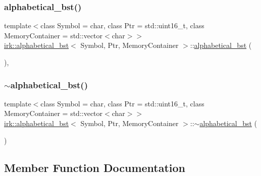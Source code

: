 \subsubsection{\texorpdfstring{alphabetical\+\_\+bst()}{alphabetical\_bst()}\hspace{0.1cm}{\footnotesize\ttfamily [4/4]}}
{\footnotesize\ttfamily template$<$class Symbol = char, class Ptr = std\+::uint16\+\_\+t, class Memory\+Container = std\+::vector$<$char$>$$>$ \\
\mbox{\hyperlink{classirk_1_1alphabetical__bst}{irk\+::alphabetical\+\_\+bst}}$<$ Symbol, Ptr, Memory\+Container $>$\+::\mbox{\hyperlink{classirk_1_1alphabetical__bst}{alphabetical\+\_\+bst}} (\begin{DoxyParamCaption}\item[{\mbox{\hyperlink{classirk_1_1alphabetical__bst}{alphabetical\+\_\+bst}}$<$ Symbol, Ptr, Memory\+Container $>$ \&\&}]{ }\end{DoxyParamCaption})\hspace{0.3cm}{\ttfamily [default]}, {\ttfamily [noexcept]}}

\mbox{\label{classirk_1_1alphabetical__bst_ae03b179ec6e763b0f74b106bd51fe1d9}} 
\subsubsection{\texorpdfstring{$\sim$alphabetical\+\_\+bst()}{~alphabetical\_bst()}}
{\footnotesize\ttfamily template$<$class Symbol = char, class Ptr = std\+::uint16\+\_\+t, class Memory\+Container = std\+::vector$<$char$>$$>$ \\
\mbox{\hyperlink{classirk_1_1alphabetical__bst}{irk\+::alphabetical\+\_\+bst}}$<$ Symbol, Ptr, Memory\+Container $>$\+::$\sim$\mbox{\hyperlink{classirk_1_1alphabetical__bst}{alphabetical\+\_\+bst}} (\begin{DoxyParamCaption}{ }\end{DoxyParamCaption})\hspace{0.3cm}{\ttfamily [default]}}



\subsection{Member Function Documentation}
\mbox{\label{classirk_1_1alphabetical__bst_ab692b132ff3a1e9f27f95af247437e1d}} 
